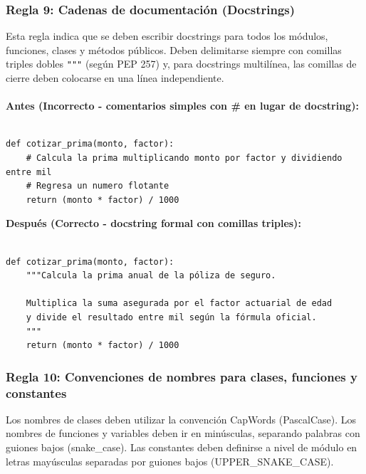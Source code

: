 \documentclass{article}
\begin{document}
    	\subsubsection*{Regla 9: Cadenas de documentación (Docstrings)}
	        Esta regla indica que se deben escribir docstrings para todos los módulos, funciones, 
			clases y métodos públicos. Deben delimitarse siempre con comillas triples dobles \texttt{"""} 
			(según PEP 257) y, para docstrings multilínea, las comillas de cierre deben colocarse en una línea independiente.\\ \\
    
    	    \textbf{Antes (Incorrecto - comentarios simples con \# en lugar de docstring):}

        	\begin{verbatim}

def cotizar_prima(monto, factor):
    # Calcula la prima multiplicando monto por factor y dividiendo entre mil
    # Regresa un numero flotante
    return (monto * factor) / 1000

        	\end{verbatim}
    
        	\textbf{Después (Correcto - docstring formal con comillas triples):}
        	\begin{verbatim}

def cotizar_prima(monto, factor):
    """Calcula la prima anual de la póliza de seguro.

    Multiplica la suma asegurada por el factor actuarial de edad
    y divide el resultado entre mil según la fórmula oficial.
    """
    return (monto * factor) / 1000

        	\end{verbatim}
    	\subsubsection*{Regla 10: Convenciones de nombres para clases, funciones y constantes}
        	Los nombres de clases deben utilizar la convención CapWords (PascalCase). Los nombres de funciones
			y variables deben ir en minúsculas, separando palabras con guiones bajos (snake\_case). Las constantes 
			deben definirse a nivel de módulo en letras mayúsculas separadas por guiones bajos (UPPER\_SNAKE\_CASE).\\ \\
    
\end{document}
